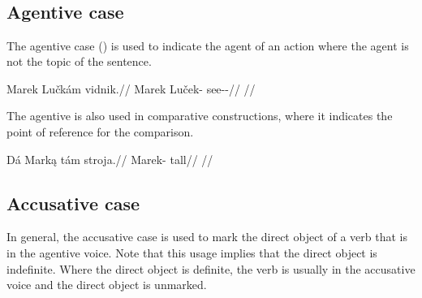 \a {}\\


\a {}\\

\a {}\\

\a {}\\

\xe 


\subsection{Agentive case}

The agentive case (\Agt{}) is used to indicate the agent of an action where the agent is not the topic of the sentence.

\pex
\begingl
\gla Marek Lučkám vidnik.//
\glb Marek Luček-\Agt{} see-\Pv{}-\Pf{}//
\glft {}//
\endgl
\xe

The agentive is also used in comparative constructions, where it indicates the point of reference for the comparison.

\pex
\begingl
\gla Dá Marką tám stroja.//
\glb \First{}\Sg{} Marek-\Agt{} \Comp{} tall//
\glft {}//
\endgl
\xe

\subsection{Accusative case}\label{sec:accusative-case}

In general, the accusative case is used to mark the direct object of a verb that
is in the agentive voice. Note that this usage implies that the direct object is
indefinite. Where the direct object is definite, the verb is usually in the
accusative voice and the direct object is unmarked.

